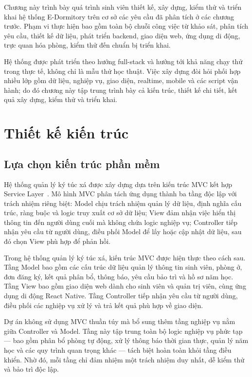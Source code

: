 \documentclass[../DoAn.tex]{subfiles}
\begin{document}
\sloppy

Chương này trình bày quá trình sinh viên thiết kế, xây dựng, kiểm thử và triển
khai hệ thống E-Dormitory trên cơ sở các yêu cầu đã phân tích ở các chương
trước. Phạm vi thực hiện bao gồm toàn bộ chuỗi công việc từ khảo sát, phân tích
yêu cầu, thiết kế dữ liệu, phát triển backend, giao diện web, ứng dụng di động,
trực quan hóa phòng, kiểm thử đến chuẩn bị triển khai.

Hệ thống được phát triển theo hướng full-stack và hướng tới khả năng chạy thử
trong thực tế, không chỉ là mẫu thử học thuật. Việc xây dựng đòi hỏi phối hợp
nhiều lớp gồm dữ liệu, nghiệp vụ, giao diện, realtime, mobile và các script vận
hành; do đó chương này tập trung trình bày cả kiến trúc, thiết kế chi tiết, kết
quả xây dựng, kiểm thử và triển khai.


\section{Thiết kế kiến trúc}
\label{sec:arch_design}

\subsection{Lựa chọn kiến trúc phần mềm}
\label{subsec:arch_choice}

Hệ thống quản lý ký túc xá được xây dựng dựa trên kiến trúc MVC kết hợp
Service Layer~\cite{fowler2002patterns}. Mô hình MVC phân tách ứng dụng thành
ba tầng độc lập với trách nhiệm riêng biệt: Model chịu trách nhiệm quản lý dữ
liệu, định nghĩa cấu trúc, ràng buộc và logic truy xuất cơ sở dữ liệu; View
đảm nhận việc hiển thị thông tin đến người dùng cuối mà không chứa logic nghiệp
vụ; Controller tiếp nhận yêu cầu từ người dùng, điều phối Model để lấy hoặc
cập nhật dữ liệu, sau đó chọn View phù hợp để phản hồi.

Trong hệ thống quản lý ký túc xá, kiến trúc MVC được hiện thực theo cách sau.
Tầng Model bao gồm các cấu trúc dữ liệu quản lý thông tin sinh viên, phòng ở,
đơn đăng ký, kết quả phân bổ, thông báo, yêu cầu bảo trì và hồ sơ năm học.
Tầng View bao gồm giao diện web dành cho sinh viên và quản trị viên, cùng
ứng dụng di động React Native. Tầng Controller tiếp nhận yêu cầu từ người
dùng, điều phối các nghiệp vụ xử lý và trả kết quả phù hợp về giao diện.

Dự án không sử dụng MVC thuần túy mà bổ sung thêm tầng nghiệp vụ nằm giữa
Controller và Model. Tầng này tập trung toàn bộ logic nghiệp vụ phức tạp ---
bao gồm phân bổ phòng tự động, xử lý thông báo thời gian thực, quản lý năm
học và các quy trình quan trọng khác --- tách biệt hoàn toàn khỏi tầng điều
khiển. Nhờ đó, mỗi tầng chỉ đảm nhiệm một trách nhiệm duy nhất, dễ kiểm thử
và bảo trì độc lập.
\end{document}
